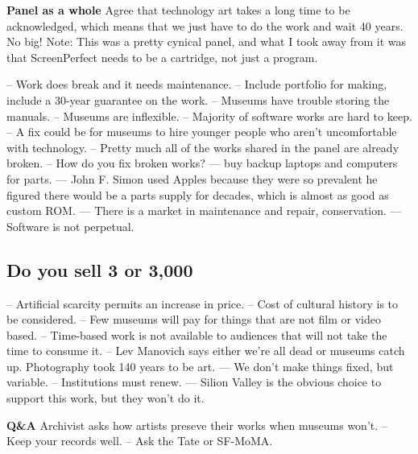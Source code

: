 \textbf{Panel as a whole}
Agree that technology art takes a long time to be acknowledged, which means that we just have to do the work and wait 40 years. No big!
Note: This was a pretty cynical panel, and what I took away from it was that ScreenPerfect needs to be a cartridge, not just a program.

-- Work does break and it needs maintenance.
-- Include portfolio for making, include a 30-year guarantee on the work.
-- Museums have trouble storing the manuals.
-- Museums are inflexible.
-- Majority of software works are hard to keep.
-- A fix could be for museums to hire younger people who aren't uncomfortable with technology.
-- Pretty much all of the works shared in the panel are already broken.
-- How do you fix broken works?
--- buy backup laptops and computers for parts.
--- John F. Simon used Apples because they were so prevalent he figured there would be a parts supply for decades, which is almost as good as custom ROM.
--- There is a market in maintenance and repair, conservation.
--- Software is not perpetual.

\subsection{Do you sell 3 or 3,000}
-- Artificial scarcity permits an increase in price.
-- Cost of cultural history is to be considered.
-- Few museums will pay for things that are not film or video based.
-- Time-based work is not available to audiences that will not take the time to consume it.
-- Lev Manovich says either we're all dead or museums catch up. Photography took 140 years to be art.
--- We don't make things fixed, but variable.
-- Institutions must renew.
--- Silion Valley is the obvious choice to support this work, but they won't do it.

\textbf{Q&A}
Archivist asks how artists preseve their works when museums won't.
-- Keep your records well.
-- Ask the Tate or SF-MoMA.
